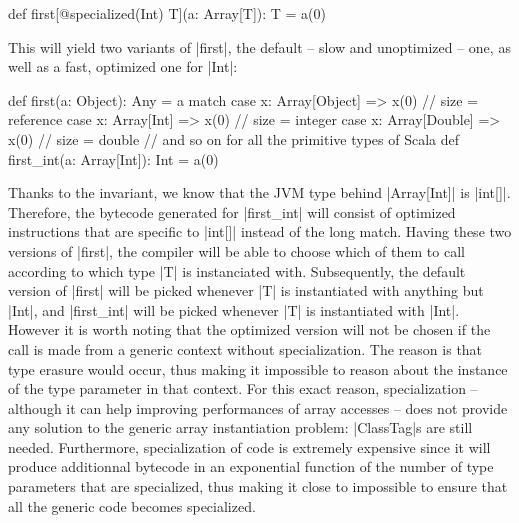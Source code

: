 
\begin{lstlisting-nobreak}
 def first[@specialized(Int) T](a: Array[T]): T = a(0)
\end{lstlisting-nobreak}

This will yield two variants of |first|, the default -- slow and unoptimized -- one, as well as a fast, optimized one for |Int|:

\begin{lstlisting-nobreak}
 def first(a: Object): Any =
   a match {
     case x: Array[Object] => x(0) // size = reference
     case x: Array[Int]    => x(0) // size = integer
     case x: Array[Double] => x(0) // size = double
     // and so on for all the primitive types of Scala
   }
 def first_int(a: Array[Int]): Int = a(0)
\end{lstlisting-nobreak}


Thanks to the invariant, we know that the JVM type behind |Array[Int]| is |int[]|. Therefore, the bytecode generated for |first_int| will consist of optimized instructions that are specific to |int[]| instead of the long match. Having these two versions of |first|, the compiler will be able to choose which of them to call according to which type |T| is instanciated with. Subsequently, the default version of |first| will be picked whenever |T| is instantiated with anything but |Int|, and |first_int| will be picked whenever |T| is instantiated with |Int|. However it is worth noting that the optimized version will not be chosen if the call is made from a generic context without specialization. The reason is that type erasure would occur, thus making it impossible to reason about the instance of the type parameter in that context. For this exact reason, specialization -- although it can help improving performances of array accesses -- does not provide any solution to the generic array instantiation problem: |ClassTag|s are still needed. Furthermore, specialization of code is extremely expensive since it will produce additionnal bytecode in an exponential function of the number of type parameters that are specialized, thus making it close to impossible to ensure that all the generic code becomes specialized.

